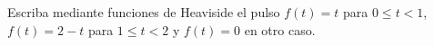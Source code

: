 Escriba mediante funciones de Heaviside el pulso $f(t)=t$ para $0\le t<1$, $f(t)=2-t$ para $1\le t<2$ y $f(t)=0$ en otro caso.
